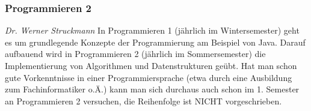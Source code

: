 
\subsubsection{Programmieren 2}
	\textit{Dr. Werner Struckmann}
	In Programmieren 1 (jährlich im Wintersemester) geht es um
	grundlegende Konzepte der Programmierung am Beispiel von Java.
	Darauf aufbauend wird in Programmieren 2 (jährlich im
	Sommersemester)  die Implementierung von Algorithmen und
	Datenstrukturen geübt. Hat man schon gute Vorkenntnisse in einer
	Programmiersprache (etwa durch eine Ausbildung zum
	Fachinformatiker o.Ä.) kann man sich durchaus auch schon im 1.
	Semester an Programmieren 2 versuchen, die Reihenfolge ist NICHT
	vorgeschrieben. 
